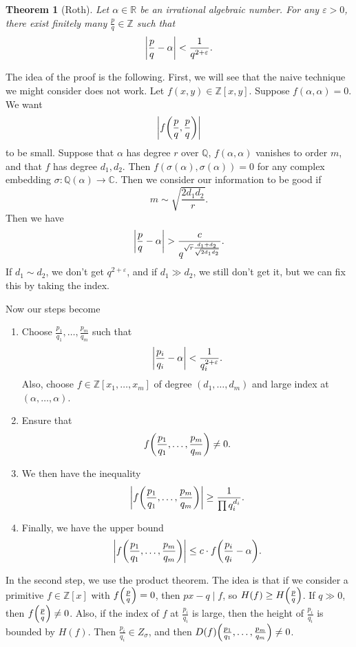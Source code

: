 \documentclass[leqno, openany]{memoir}
\newtheorem{thm}{Theorem}[section]
\theoremstyle{definition}
\theoremstyle{remark}
\theoremstyle{plain}
\theoremstyle{definition}
\theoremstyle{remark}
\newcommand{\R}{\mathbb{R}}
\newcommand{\C}{\mathbb{C}}
\newcommand{\Z}{\mathbb{Z}}
\newcommand{\Q}{\mathbb{Q}}
\newcommand{\ep}{\varepsilon}
\begin{document}
\begin{thm}[Roth]
    Let $\alpha \in \R$ be an irrational algebraic number. For any $\ep > 0$, there exist finitely many $\frac{p}{q} \in \Z$ such that
    \[ \abs{\frac{p}{q} - \alpha} < \frac{1}{q^{2+\ep}}. \]
\end{thm}

The idea of the proof is the following. First, we will see that the naive technique we might consider does not work. Let $f(x,y) \in \Z[x,y]$. Suppose $f(\alpha, \alpha) = 0$. We want
\[ \abs{f\qty(\frac{p}{q},\frac{p}{q})} \]
to be small. Suppose that $\alpha$ has degree $r$ over $\Q$, $f(\alpha, \alpha)$ vanishes to order $m$, and that $f$ has degree $d_1, d_2$. Then $f(\sigma(\alpha), \sigma(\alpha)) = 0$ for any complex embedding $\sigma \colon \Q(\alpha) \to \C$. Then we consider our information to be good if
\[ m \sim \sqrt{\frac{2 d_1 d_2}{r}}. \]
Then we have
\[ \abs{\frac{p}{q} - \alpha} > \frac{c}{q^{\sqrt{r} \frac{d_1 + d_2}{\sqrt{2 d_1 d_2}}}}. \]
If $d_1 \sim d_2$, we don't get $q^{2 + \ep}$, and if $d_1 \gg d_2$, we still don't get it, but we can fix this by taking the index.

Now our steps become
\begin{enumerate}[(1)]
    \item Choose $\frac{p_1}{q_1}, \ldots, \frac{p_m}{q_m}$ such that 
        \[ \abs{\frac{p_i}{q_i} - \alpha} < \frac{1}{q_i^{2+\ep}}. \]
        Also, choose $f \in \Z[x_1, \ldots, x_m]$ of degree $(d_1, \ldots, d_m)$ and large index at $(\alpha, \ldots, \alpha)$.
    \item Ensure that
        \[ f\qty(\frac{p_1}{q_1}, \ldots, \frac{p_m}{q_m}) \neq 0. \]
    \item We then have the inequality
        \[ \abs{f\qty(\frac{p_1}{q_1}, \ldots, \frac{p_m}{q_m})} \geq \frac{1}{\prod q_i^{d_i}}. \]
    \item Finally, we have the upper bound
        \[ \abs{f \qty(\frac{p_1}{q_1}, \ldots, \frac{p_m}{q_m})} \leq c \cdot f\qty(\frac{p_i}{q_i} - \alpha). \]
\end{enumerate}
In the second step, we use the product theorem. The idea is that if we consider a primitive $f \in \Z[x]$ with $f\qty(\frac{p}{q}) = 0$, then $px-q \mid f$, so $H(f) \geq H\qty(\frac{p}{q})$. If $q \gg 0$, then $f\qty(\frac{p}{q}) \neq 0$. Also, if the index of $f$ at $\frac{p_i}{q_i}$ is large, then the height of $\frac{p_i}{q_i}$ is bounded by $H(f)$. Then $\frac{p_i}{q_i} \in Z_{\sigma}$, and then $D(f)\qty(\frac{p_1}{q_1}, \ldots, \frac{p_m}{q_m}) \neq 0$.
\end{document}
